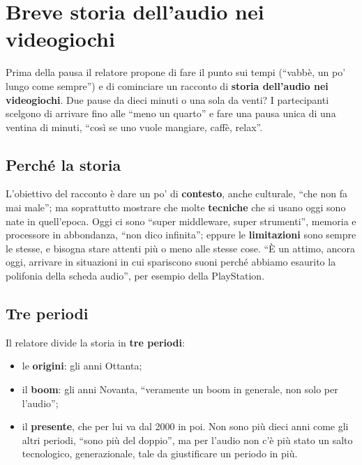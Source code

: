 \section{Breve storia dell'audio nei videogiochi}
\label{z9:sec:storia}

Prima della pausa il relatore propone di fare il punto sui tempi (``vabbè, un po'
lungo come sempre'') e di cominciare un racconto di \textbf{storia dell'audio
nei videogiochi}. Due pause da dieci minuti o una sola da venti? I partecipanti
scelgono di arrivare fino alle ``meno un quarto'' e fare una pausa unica di una
ventina di minuti, ``così se uno vuole mangiare, caffè, relax''.

\subsection{Perché la storia}

L'obiettivo del racconto è dare un po' di \textbf{contesto}, anche culturale,
``che non fa mai male''; ma soprattutto mostrare che molte \textbf{tecniche} che
si usano oggi sono nate in quell'epoca. Oggi ci sono ``super middleware, super
strumenti'', memoria e processore in abbondanza, ``non dico infinita''; eppure
le \textbf{limitazioni} sono sempre le stesse, e bisogna stare attenti più o meno
alle stesse cose. ``È un attimo, ancora oggi, arrivare in situazioni in cui
spariscono suoni perché abbiamo esaurito la polifonia della scheda audio'', per
esempio della PlayStation.

\subsection{Tre periodi}

Il relatore divide la storia in \textbf{tre periodi}:
\begin{itemize}
  \item le \textbf{origini}: gli anni Ottanta;
  \item il \textbf{boom}: gli anni Novanta, ``veramente un boom in generale, non
        solo per l'audio'';
  \item il \textbf{presente}, che per lui va dal 2000 in poi. Non sono più dieci
        anni come gli altri periodi, ``sono più del doppio'', ma per l'audio
        non c'è più stato un salto tecnologico, generazionale, tale da
        giustificare un periodo in più.
\end{itemize}

